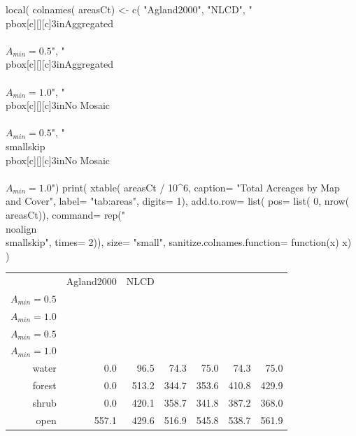 \begin{Schunk}
\begin{Sinput}
 local({
   colnames( areasCt) <- c( "Agland2000", "NLCD",
                           "\\pbox[c][][c]{3in}{Aggregated\\\\$A_{min}=0.5$}",
                           "\\pbox[c][][c]{3in}{Aggregated\\\\$A_{min}=1.0$}",
                           "\\pbox[c][][c]{3in}{No Mosaic\\\\$A_{min}=0.5$}",
                           "\\smallskip\\pbox[c][][c]{3in}{No Mosaic\\\\$A_{min}=1.0$}")
   print( xtable( areasCt / 10^6, 
                 caption= "Total Acreages by Map and Cover", 
                 label= "tab:areas",
                 digits= 1),
         add.to.row= list( 
           pos= list( 0, nrow( areasCt)),
           command= rep("\\noalign{\\smallskip}", times= 2)),
         size= "small",
         sanitize.colnames.function= function(x) x)
 })
\end{Sinput}
\begin{table}[ht]
\begin{center}
{\small
\begin{tabular}{rrrrrrr}
  \hline
 & Agland2000 & NLCD & \pbox[c][][c]{3in}{Aggregated\\$A_{min}=0.5$} & \pbox[c][][c]{3in}{Aggregated\\$A_{min}=1.0$} & \pbox[c][][c]{3in}{No Mosaic\\$A_{min}=0.5$} & \smallskip\pbox[c][][c]{3in}{No Mosaic\\$A_{min}=1.0$} \\ 
  \noalign{\smallskip} \hline
water & 0.0 & 96.5 & 74.3 & 75.0 & 74.3 & 75.0 \\ 
  forest & 0.0 & 513.2 & 344.7 & 353.6 & 410.8 & 429.9 \\ 
  shrub & 0.0 & 420.1 & 358.7 & 341.8 & 387.2 & 368.0 \\ 
  open & 557.1 & 429.6 & 516.9 & 545.8 & 538.7 & 561.9 \\ 

\end{tabular}}
\end{center}
\end{table}
\end{Schunk}
